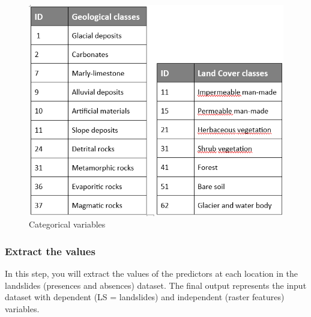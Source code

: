 \documentclass[
]{article}
\newenvironment{Shaded}{\begin{snugshade}}{\end{snugshade}}
\newcommand{\AttributeTok}[1]{\textcolor[rgb]{0.13,0.29,0.53}{#1}}
\newcommand{\CommentTok}[1]{\textcolor[rgb]{0.56,0.35,0.01}{\textit{#1}}}
\newcommand{\ConstantTok}[1]{\textcolor[rgb]{0.56,0.35,0.01}{#1}}
\newcommand{\DecValTok}[1]{\textcolor[rgb]{0.00,0.00,0.81}{#1}}
\newcommand{\FunctionTok}[1]{\textcolor[rgb]{0.13,0.29,0.53}{\textbf{#1}}}
\newcommand{\NormalTok}[1]{#1}
\newcommand{\OtherTok}[1]{\textcolor[rgb]{0.56,0.35,0.01}{#1}}
\newcommand{\SpecialCharTok}[1]{\textcolor[rgb]{0.81,0.36,0.00}{\textbf{#1}}}
\newcommand{\StringTok}[1]{\textcolor[rgb]{0.31,0.60,0.02}{#1}}
\begin{document}
\begin{figure}

{\centering \includegraphics[width=0.8\linewidth,height=0.8\textheight]{data/RF/CatClasses} 

}

\caption{Categorical variables \label{CatClass}}\label{fig:cat-class}
\end{figure}

\newpage

\subsubsection{Extract the values}\label{extract-the-values}

In this step, you will extract the values of the predictors at each location in the landslides (presences and absences) dataset.
The final output represents the input dataset with dependent (LS = landslides) and independent (raster features) variables.

\begin{Shaded}
\end{Shaded}
\end{document}
